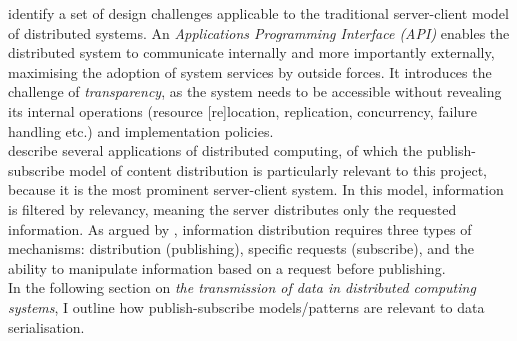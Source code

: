 \documentclass[../report.tex]{subfiles}
\begin{document}
\cite{kshemkalyani2011distributed} identify a set of design challenges applicable to the traditional server-client model of distributed systems. An \textit{Applications Programming Interface (API)} enables the distributed system to communicate internally and more importantly externally, maximising the adoption of system services by outside forces. It introduces the challenge of \textit{transparency}, as the system needs to be accessible without revealing its internal operations (resource [re]location, replication, concurrency, failure handling etc.) and implementation policies. \\

\cite{kshemkalyani2011distributed} describe several applications of distributed computing, of which the publish-subscribe model of content distribution is particularly relevant to this project, because it is the most prominent server-client system. In this model, information is filtered by relevancy, meaning the server distributes only the requested information. As argued by \cite{kshemkalyani2011distributed}, information distribution requires three types of mechanisms: distribution (publishing), specific requests (subscribe), and the ability to manipulate information based on a request before publishing. \\

In the following section on \textit{the transmission of data in distributed computing systems}, I outline how publish-subscribe models/patterns are relevant to data serialisation.


\end{document}
